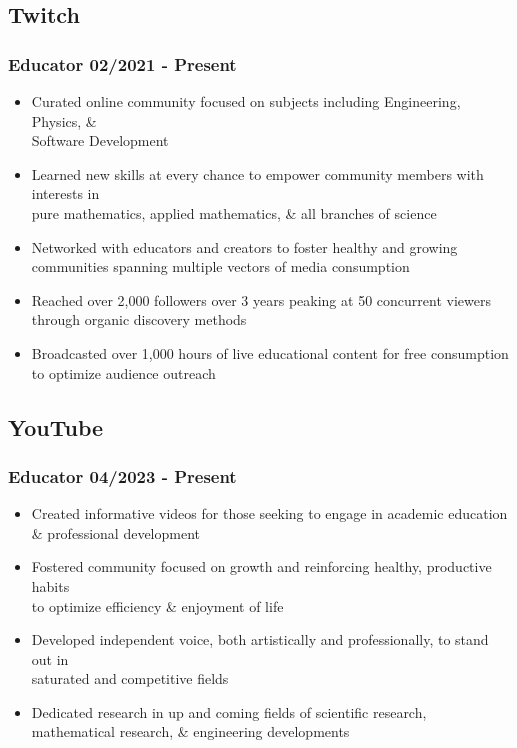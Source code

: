 \documentclass[10pt]{article} %
\begin{document}
\subsection{Twitch}
\subsubsection{Educator \hfill 02/2021 - Present}
\begin{itemize}
    \item {Curated online community focused on subjects including Engineering,  
        Physics, \& \\ Software Development}
    \item {Learned new skills at every chance to empower community members 
        with interests in \\ pure mathematics, applied mathematics, 
        \& all branches of science}
    \item {Networked with educators and creators to foster healthy and growing 
        communities spanning multiple vectors of media consumption}
    \item {Reached over 2,000 followers over 3 years peaking at 
        50 concurrent viewers through organic discovery methods}
    \item {Broadcasted over 1,000 hours of live educational content for free 
        consumption to optimize audience outreach}
\end{itemize}

\subsection{YouTube}
\subsubsection{Educator \hfill 04/2023 - Present}
\begin{itemize}
    \item {Created informative videos for those seeking to engage in academic 
        education \\ \& professional development}
    \item {Fostered community focused on growth and reinforcing healthy, 
        productive habits \\ to optimize efficiency \& enjoyment of life}
    \item {Developed independent voice, both artistically and professionally,
        to stand out in \\ saturated and competitive fields}
    \item {Dedicated research in up and coming fields of scientific research, \\ 
        mathematical research, \& engineering developments}
\end{itemize}  
\end{document}
